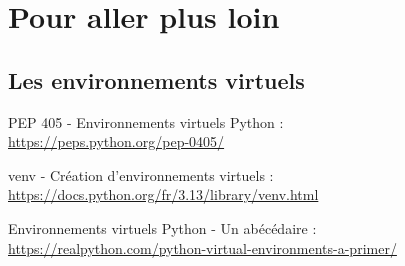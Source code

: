 \chapter{Pour aller plus loin}

\section*{Les environnements virtuels}
\begin{coloredenum}
    \item PEP 405 - Environnements virtuels Python :\\ \url{https://peps.python.org/pep-0405/}
    \item venv - Création d'environnements virtuels :\\ \url{https://docs.python.org/fr/3.13/library/venv.html}
    \item Environnements virtuels Python - Un abécédaire : \\ \url{https://realpython.com/python-virtual-environments-a-primer/}
\end{coloredenum}
